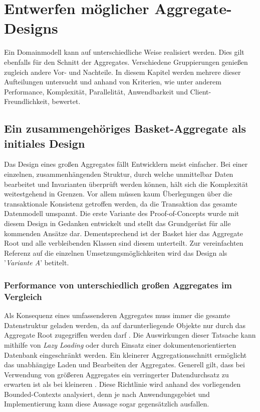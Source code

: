 \chapter{Entwerfen möglicher Aggregate-Designs}

Ein Domainmodell kann auf unterschiedliche Weise realisiert werden. Dies gilt ebenfalls für den Schnitt der Aggregates. Verschiedene Gruppierungen genießen zugleich andere Vor- und Nachteile. In diesem Kapitel werden mehrere dieser Aufteilungen untersucht und anhand von Kriterien, wie unter anderem Performance, Komplexität, Parallelität, Anwendbarkeit und Client-Freundlichkeit, bewertet.

\section{Ein zusammengehöriges Basket-Aggregate als initiales Design}

Das Design eines großen Aggregates fällt Entwicklern meist einfacher. Bei einer einzelnen, zusammenhängenden Struktur, durch welche unmittelbar Daten bearbeitet und Invarianten überprüft werden können, hält sich die Komplexität weitestgehend in Grenzen. Vor allem müssen kaum Überlegungen über die transaktionale Konsistenz getroffen werden, da die Transaktion das gesamte Datenmodell umspannt. Die erste Variante des Proof-of-Concepts wurde mit diesem Design in Gedanken entwickelt und stellt das Grundgerüst für alle kommenden Ansätze dar. Dementsprechend ist der Basket hier das Aggregate Root und alle verbleibenden Klassen sind diesem unterteilt. Zur vereinfachten Referenz auf die einzelnen Umsetzungsmöglichkeiten wird das Design als '\emph{Variante A}' betitelt.

\subsection{Performance von unterschiedlich großen Aggregates im Vergleich}

Als Konsequenz eines umfassenderen Aggregates muss immer die gesamte Datenstruktur geladen werden, da auf darunterliegende Objekte nur durch das Aggregate Root zugegriffen werden darf \cite[S. 128]{Evans.2011}. Die Auswirkungen dieser Tatsache kann mithilfe von \emph{\Gls{Lazy Loading}} oder durch Einsatz einer dokumentenorientierten Datenbank eingeschränkt werden. Ein kleinerer Aggregationsschnitt ermöglicht das unabhängige Laden und Bearbeiten der Aggregates. Generell gilt, dass bei Verwendung von größeren Aggregates ein verringerter Datendurchsatz zu erwarten ist als bei kleineren \cite[S. 355f.]{Vernon.2015}. Diese Richtlinie wird anhand des vorliegenden Bounded-Contexts analysiert, denn je nach Anwendungsgebiet und Implementierung kann diese Aussage sogar gegensätzlich ausfallen. 

